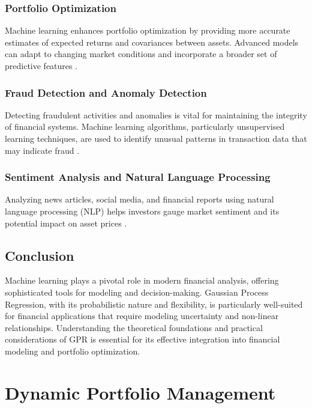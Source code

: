 \subsubsection{Portfolio Optimization}

Machine learning enhances portfolio optimization by providing more accurate estimates of expected returns and covariances between assets. Advanced models can adapt to changing market conditions and incorporate a broader set of predictive features \cite{heaton2017deep}.

\subsubsection{Fraud Detection and Anomaly Detection}

Detecting fraudulent activities and anomalies is vital for maintaining the integrity of financial systems. Machine learning algorithms, particularly unsupervised learning techniques, are used to identify unusual patterns in transaction data that may indicate fraud \cite{phua2010comprehensive}.

\subsubsection{Sentiment Analysis and Natural Language Processing}

Analyzing news articles, social media, and financial reports using natural language processing (NLP) helps investors gauge market sentiment and its potential impact on asset prices \cite{hagenau2013automated, loughran2011liability}.

\subsection{Conclusion}

Machine learning plays a pivotal role in modern financial analysis, offering sophisticated tools for modeling and decision-making. Gaussian Process Regression, with its probabilistic nature and flexibility, is particularly well-suited for financial applications that require modeling uncertainty and non-linear relationships. Understanding the theoretical foundations and practical considerations of GPR is essential for its effective integration into financial modeling and portfolio optimization.


\section{Dynamic Portfolio Management}

